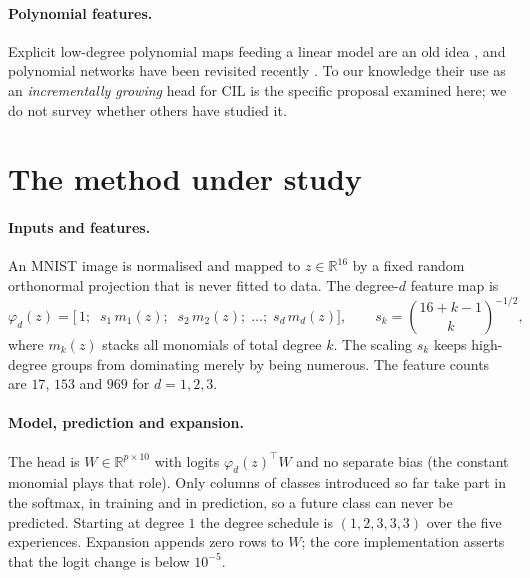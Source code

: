 \documentclass[11pt,a4paper]{article}
\begin{document}
\paragraph{Polynomial features.}
Explicit low-degree polynomial maps feeding a linear model are an old idea \cite{ivakhnenko1971,chang2010}, and polynomial networks have been revisited recently \cite{chrysos2022}. To our knowledge their use as an \emph{incrementally growing} head for CIL is the specific proposal examined here; we do not survey whether others have studied it.

\section{The method under study}
\label{sec:method}
\paragraph{Inputs and features.}
An MNIST image is normalised and mapped to $z\in\mathbb{R}^{16}$ by a fixed random orthonormal projection that is never fitted to data. The degree-$d$ feature map is
\begin{equation}
\varphi_d(z)=\Big[\,1;\;\; s_1\,m_1(z);\;\; s_2\,m_2(z);\;\dots;\; s_d\,m_d(z)\Big],\qquad s_k=\binom{16+k-1}{k}^{-1/2},
\end{equation}
where $m_k(z)$ stacks all monomials of total degree $k$. The scaling $s_k$ keeps high-degree groups from dominating merely by being numerous. The feature counts are $17$, $153$ and $969$ for $d=1,2,3$.

\paragraph{Model, prediction and expansion.}
The head is $W\in\mathbb{R}^{p\times 10}$ with logits $\varphi_d(z)^\top W$ and no separate bias (the constant monomial plays that role). Only columns of classes introduced so far take part in the softmax, in training and in prediction, so a future class can never be predicted. Starting at degree $1$ the degree schedule is $(1,2,3,3,3)$ over the five experiences. Expansion appends zero rows to $W$; the core implementation asserts that the logit change is below $10^{-5}$.
\end{document}
